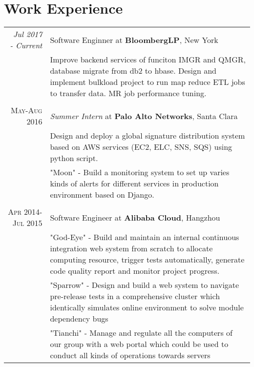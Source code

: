\documentclass[a4paper,10pt]{article}
\begin{document}
\section{Work Experience}
\begin{tabular}{r|p{11cm}}
  \emph{Jul 2017 - Current} & Software Enginner at \textbf{BloombergLP}, New York\\
  &\footnotesize{Improve backend services of funciton IMGR and QMGR, database migrate from db2 to hbase. Design and implement bulkload project to run map reduce ETL jobs to transfer data. MR job performance tuning.}\\
  \multicolumn{2}{c}{} \\
  \textsc{May-Aug 2016}&\emph{Summer Intern} at \textbf{Palo Alto Networks}, Santa Clara\\
  &\footnotesize{Design and deploy a global signature distribution system based on AWS services (EC2, ELC, SNS, SQS) using python script.}\\
  &\footnotesize{"Moon" - Build a monitoring system to set up varies kinds of alerts for different services in production environment based on Django.}\\
  \multicolumn{2}{c}{}\\
  \textsc{Apr 2014-Jul 2015} & Software Engineer at \textbf{Alibaba Cloud}, Hangzhou \\
  &\footnotesize{"God-Eye" - Build and maintain an internal continuous integration web system from scratch to allocate computing resource, trigger tests automatically, generate code quality report and monitor project progress.}\\
  &\footnotesize{"Sparrow" - Design and build a web system to navigate pre-release tests in a comprehensive cluster which identically simulates online environment to solve module dependency bugs}\\
  &\footnotesize{"Tianchi" - Manage and regulate all the computers of our group with a web portal which could be used to conduct all kinds of operations towards servers
}\\
\end{tabular}
\end{document}
